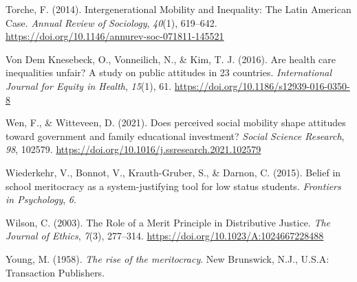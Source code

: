 \documentclass[
  13pt,
]{article}
\newlength{\cslhangindent}
\newenvironment{CSLReferences}[2] %
 {\begin{list}{}{%
  \setlength{\itemindent}{0pt}
  \setlength{\leftmargin}{0pt}
  \setlength{\parsep}{0pt}
  \ifodd #1
   \setlength{\leftmargin}{\cslhangindent}
   \setlength{\itemindent}{-1\cslhangindent}
  \fi
  \setlength{\itemsep}{#2\baselineskip}}}
 {\end{list}}
\begin{document}
\begin{CSLReferences}{1}{0}
Torche, F. (2014). Intergenerational {Mobility} and {Inequality}: {The
Latin American Case}. \emph{Annual Review of Sociology}, \emph{40}(1),
619--642. \url{https://doi.org/10.1146/annurev-soc-071811-145521}

Von Dem Knesebeck, O., Vonneilich, N., \& Kim, T. J. (2016). Are health
care inequalities unfair? {A} study on public attitudes in 23 countries.
\emph{International Journal for Equity in Health}, \emph{15}(1), 61.
\url{https://doi.org/10.1186/s12939-016-0350-8}

Wen, F., \& Witteveen, D. (2021). Does perceived social mobility shape
attitudes toward government and family educational investment?
\emph{Social Science Research}, \emph{98}, 102579.
\url{https://doi.org/10.1016/j.ssresearch.2021.102579}

Wiederkehr, V., Bonnot, V., Krauth-Gruber, S., \& Darnon, C. (2015).
Belief in school meritocracy as a system-justifying tool for low status
students. \emph{Frontiers in Psychology}, \emph{6}.

Wilson, C. (2003). The {Role} of a {Merit Principle} in {Distributive
Justice}. \emph{The Journal of Ethics}, \emph{7}(3), 277--314.
\url{https://doi.org/10.1023/A:1024667228488}

Young, M. (1958). \emph{The rise of the meritocracy}. New Brunswick,
N.J., U.S.A: Transaction Publishers.

\end{CSLReferences}
\end{document}

